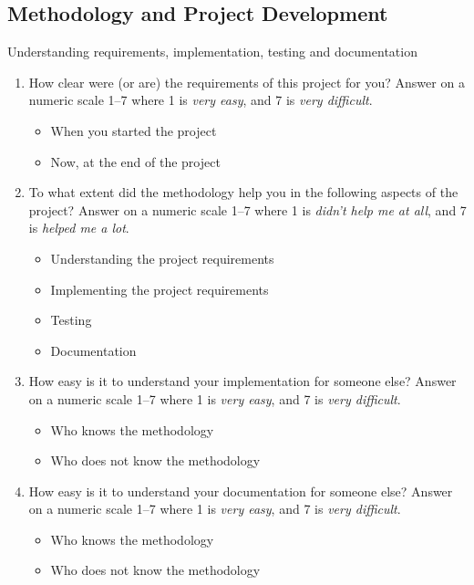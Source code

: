 \subsection*{Methodology and Project Development}
Understanding requirements, implementation, testing and documentation

\begin{enumerate}

\item How clear were (or are) the requirements of this project for you? 
Answer on a numeric scale 1--7 where 1 is \emph{very easy}, and 7 is \emph{very difficult}.
\begin{itemize}
\item When you started the project	
\item Now, at the end of the project	
\end{itemize}

\item To what extent did the methodology help you in the following aspects of the project? 
Answer on a numeric scale 1--7 where 1 is \emph{didn't help me at all}, and 7 is \emph{helped me a lot}.
\begin{itemize}
\item Understanding the project requirements	
\item Implementing the project requirements	
\item Testing	
\item Documentation	
\end{itemize}

\item How easy is it to understand your implementation for someone else? 
Answer on a numeric scale 1--7 where 1 is \emph{very easy}, and 7 is \emph{very difficult}.
\begin{itemize}
\item Who knows the methodology	
\item Who does not know the methodology	
\end{itemize}

\item How easy is it to understand your documentation for someone else? 
Answer on a numeric scale 1--7 where 1 is \emph{very easy}, and 7 is \emph{very difficult}.
\begin{itemize}
\item Who knows the methodology	
\item Who does not know the methodology	
\end{itemize}


\end{enumerate}
